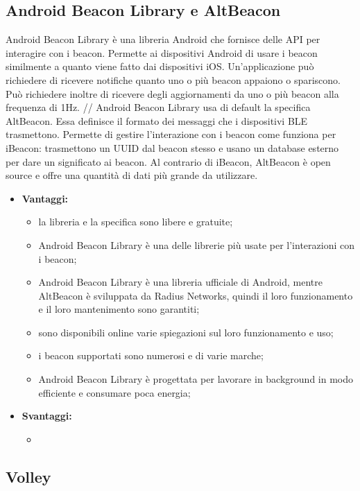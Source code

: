 \subsection{Android Beacon Library e AltBeacon}
	Android Beacon Library è una libreria Android che fornisce delle API per interagire con i beacon. Permette ai dispositivi Android di usare i beacon similmente a quanto viene fatto dai dispositivi iOS. Un'applicazione può richiedere di ricevere notifiche quanto uno o più beacon appaiono o spariscono. Può richiedere inoltre di ricevere degli aggiornamenti da uno o più beacon alla frequenza di 1Hz. //
	Android Beacon Library usa di default la specifica AltBeacon. Essa definisce il formato dei messaggi che i dispositivi BLE trasmettono. Permette di gestire l'interazione con i beacon come funziona per iBeacon: trasmettono un UUID dal beacon stesso e usano un database esterno per dare un significato ai beacon.
	Al contrario di iBeacon, AltBeacon è open source e offre una quantità di dati più grande da utilizzare.
	
	\begin{itemize} %
		\item \textbf{Vantaggi:}
			\begin{itemize}
				\item la libreria e la specifica sono libere e gratuite;
				\item Android Beacon Library è una delle librerie più usate per l'interazioni con i beacon;
				\item Android Beacon Library è una libreria ufficiale di Android, mentre AltBeacon è sviluppata da Radius Networks, quindi il loro funzionamento e il loro mantenimento sono garantiti;
				\item sono disponibili online varie spiegazioni sul loro funzionamento e uso;
				\item i beacon supportati sono numerosi e di varie marche;
				\item Android Beacon Library è progettata per lavorare in background in modo efficiente e consumare poca energia;
			\end{itemize}
		\item \textbf{Svantaggi:}
			\begin{itemize}
				\item
			\end{itemize}
	\end{itemize}
		
\subsection{Volley}

